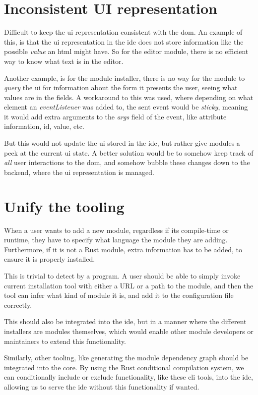 \section{Inconsistent UI representation}

Difficult to keep the \gls*{ui} representation consistent with the \gls*{dom}.
An example of this, is that the \gls*{ui} representation in the \gls*{ide} does
not store information like the possible \textit{value} an \gls{html} might
have. So for the editor module, there is no efficient way to know what text is
in the editor.

Another example, is for the module installer, there is no way for the module to
\textit{query} the \gls*{ui} for information about the form it presents the
user, seeing what values are in the fields. A workaround to this was used, where
depending on what element an \textit{eventListener} was added to, the sent event
would be \textit{sticky}, meaning it would add extra arguments to the
\textit{args} field of the event, like attribute information, id, value, etc.

But this would not update the \gls*{ui} stored in the \gls*{ide}, but rather
give modules a peek at the current \gls*{ui} state. A better solution would be
to somehow keep track of \textit{all} user interactions to the \gls*{dom}, and
somehow bubble these changes down to the backend, where the \gls*{ui}
representation is managed.


\section{Unify the tooling}

When a user wants to add a new module, regardless if its compile-time or
runtime, they have to specify what language the module they are adding.
Furthermore, if it is not a Rust module, extra information has to be added, to
ensure it is properly installed.


This is trivial to detect by a program. A user should be able to simply invoke
current installation tool with either a URL or a path to the module, and then
the tool can infer what kind of module it is, and add it to the configuration
file correctly.

This should also be integrated into the \gls*{ide}, but in a manner where the
different installers are modules themselves, which would enable other module
developers or maintainers to extend this functionality.

Similarly, other tooling, like generating the module dependency graph should be
integrated into the core. By using the Rust conditional compilation system, we
can conditionally include or exclude functionality, like these \gls*{cli} tools,
into the \gls*{ide}, allowing us to serve the \gls*{ide} without this
functionality if wanted.


